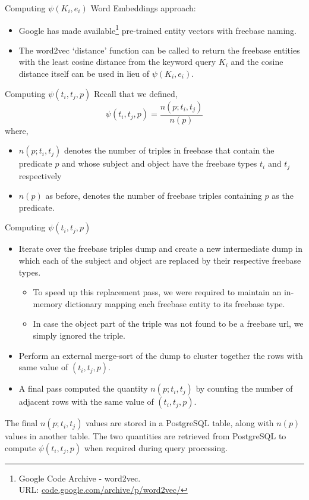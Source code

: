 \documentclass[pdf,11pt]{beamer}
\begin{document}
\begin{frame}{Computing $\psi(K_i, e_i)$}
Word Embeddings approach:

\begin{itemize}
\item Google has made available\footnote{Google Code Archive - word2vec. \\ URL: \url{code.google.com/archive/p/word2vec/}} pre-trained entity vectors with freebase naming.
\item The word2vec `distance' function can be called to return the freebase entities with the least cosine distance from the keyword query $K_i$ and the cosine distance itself can be used in lieu of $\psi(K_i,e_i)$.
\end{itemize}
\end{frame}

\begin{frame}{Computing $\psi(t_i, t_j, p)$}
Recall that we defined, $$\psi(t_i, t_j, p) = \frac{n(p;t_i,t_j)}{n(p)}$$
where,
\begin{itemize}
\item $n(p;t_i,t_j)$ denotes the number of triples in freebase that contain the predicate $p$ and whose subject and object have the freebase types $t_i$ and $t_j$ respectively
\item $n(p)$ as before, denotes the number of freebase triples containing $p$ as the predicate.
\end{itemize}

\end{frame}

\begin{frame}{Computing $\psi(t_i, t_j, p)$}

\begin{itemize}
\item Iterate over the freebase triples dump and create a new intermediate dump in which each of the subject and object are replaced by their respective freebase types.
\begin{itemize} \item To speed up this replacement pass, we were required to maintain an in-memory dictionary mapping each freebase entity to its freebase type.
\item In case the object part of the triple was not found to be a freebase url, we simply ignored the triple.
\end{itemize}

\item Perform an external merge-sort of the dump to cluster together the rows with same value of $(t_i,t_j,p)$.
\item A final pass computed the quantity $n(p;t_i,t_j)$ by counting the number of adjacent rows with the same value of $(t_i, t_j,p)$.

\end{itemize}

The final $n(p;t_i,t_j)$ values are stored in a PostgreSQL table, along with $n(p)$ values in another table. The two quantities are retrieved from PostgreSQL to compute $\psi(t_i,t_j,p)$ when required during query processing.

\end{frame}
\end{document}
